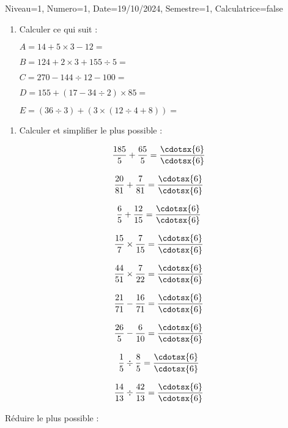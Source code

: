\documentclass[a4paper,12pt]{article}
\begin{document}
\begin{Maquette}[DS]{Niveau=1, Numero=1, Date=19/10/2024, Semestre=1, Calculatrice=false}

\begin{exercice}
\begin{enumerate}
\item{} Calculer ce qui suit :
\begin{multicols}{2}		
$ A=14+5\times 3-12=$\anserline[3]

$ B=124+2\times 3+155\div 5=$\anserline[3]

$ C=270-144\div 12-100=$\anserline[3]
\columnbreak

$ D=155+(17-34\div 2)\times 85=$\anserline[4]

$ E=(36\div 3)+(3\times(12\div 4+8))=$\anserline[5]
\end{multicols}
\end{enumerate}	
\end{exercice}

\begin{exercice}
	\begin{enumerate}
\item{} Calculer et simplifier le plus possible :
		\end{enumerate}
\begin{multicols}{3}		

\[\dfrac{185}{5}+\dfrac{65}{5}=\dfrac{\cdotsx{6}}{\cdotsx{6}}\]

\[\dfrac{20}{81}+\dfrac{7}{81}=\dfrac{\cdotsx{6}}{\cdotsx{6}}\]

\[\dfrac{6}{5}+\dfrac{12}{15}=\dfrac{\cdotsx{6}}{\cdotsx{6}}\]

\[\dfrac{15}{7}\times \dfrac{7}{15}=\dfrac{\cdotsx{6}}{\cdotsx{6}}\]

\[\dfrac{44}{51}\times\dfrac{7}{22}=\dfrac{\cdotsx{6}}{\cdotsx{6}}\]

\[\dfrac{21}{71}-\dfrac{16}{71}=\dfrac{\cdotsx{6}}{\cdotsx{6}}\]

\[\dfrac{26}{5}-\dfrac{6}{10}=\dfrac{\cdotsx{6}}{\cdotsx{6}}\]

\[\dfrac{1}{5}\div\dfrac{8}{5}=\dfrac{\cdotsx{6}}{\cdotsx{6}}\]

\[\dfrac{14}{13}\div\dfrac{42}{13}=\dfrac{\cdotsx{6}}{\cdotsx{6}}\]
\end{multicols}	
\vspace{1cm}	
\end{exercice}
\newpage
\begin{exercice}
  Réduire le plus possible :
		

\end{exercice}
\end{Maquette}
\end{document}
